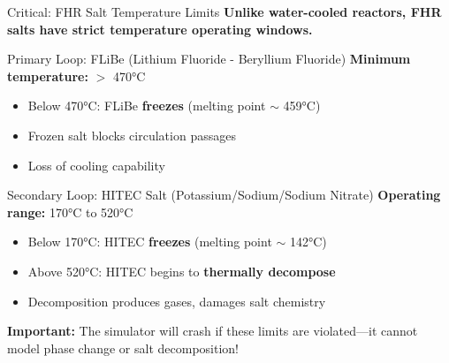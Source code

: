 \documentclass[aspectratio=169]{beamer}
\begin{document}
\begin{frame}[allowframebreaks]{Critical: FHR Salt Temperature Limits}
    \textbf{Unlike water-cooled reactors, FHR salts have strict temperature operating windows.}

    \vspace{1em}
    \begin{alertblock}{Primary Loop: FLiBe (Lithium Fluoride - Beryllium Fluoride)}
        \textbf{Minimum temperature:} $>$ 470°C
        \begin{itemize}
            \item Below 470°C: FLiBe \textbf{freezes} (melting point $\sim$ 459°C)
            \item Frozen salt blocks circulation passages
            \item Loss of cooling capability
        \end{itemize}
    \end{alertblock}

    \vspace{1em}
    \begin{alertblock}{Secondary Loop: HITEC Salt (Potassium/Sodium/Sodium Nitrate)}
        \textbf{Operating range:} 170°C to 520°C
        \begin{itemize}
            \item Below 170°C: HITEC \textbf{freezes} (melting point $\sim$ 142°C)
            \item Above 520°C: HITEC begins to \textbf{thermally decompose}
            \item Decomposition produces gases, damages salt chemistry
        \end{itemize}
    \end{alertblock}

    \vspace{1em}
    \textbf{Important:} The simulator will crash if these limits are violated—it cannot model phase change or salt decomposition!
\end{frame}
\end{document}
